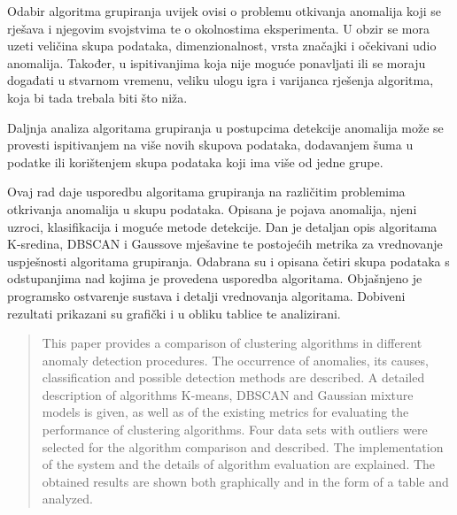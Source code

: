 \documentclass[utf8, diplomski, numeric]{fer}
\begin{document}
Odabir algoritma grupiranja uvijek ovisi o problemu otkivanja anomalija koji se rješava i njegovim svojstvima te o okolnostima eksperimenta. U obzir se mora uzeti veličina skupa podataka, dimenzionalnost, vrsta značajki i očekivani udio anomalija. Također, u ispitivanjima koja nije moguće ponavljati ili se moraju događati u stvarnom vremenu, veliku ulogu igra i varijanca rješenja algoritma, koja bi tada trebala biti što niža. 

Daljnja analiza algoritama grupiranja u postupcima detekcije anomalija može se provesti ispitivanjem na više novih skupova podataka, dodavanjem šuma u podatke ili korištenjem skupa podataka koji ima više od jedne grupe.

\nocite{*}



\begin{sazetak}
Ovaj rad daje usporedbu algoritama grupiranja na različitim problemima otkrivanja anomalija u skupu podataka. Opisana je pojava anomalija, njeni uzroci, klasifikacija i moguće metode detekcije. Dan je detaljan opis algoritama K-sredina, DBSCAN i Gaussove mješavine te postojećih metrika za vrednovanje uspješnosti algoritama grupiranja. Odabrana su i opisana četiri skupa podataka s odstupanjima nad kojima je provedena usporedba algoritama. Objašnjeno je programsko ostvarenje sustava i detalji vrednovanja algoritama. Dobiveni rezultati prikazani su grafički i u obliku tablice te analizirani.

\end{sazetak}

\begin{abstract}
This paper provides a comparison of clustering algorithms in different anomaly detection procedures. The occurrence of anomalies, its causes, classification and possible detection methods are described. A detailed description of algorithms K-means, DBSCAN and Gaussian mixture models is given, as well as of the existing metrics for evaluating the performance of clustering algorithms. Four data sets with outliers were selected for the algorithm comparison and described. The implementation of the system and the details of algorithm evaluation are explained. The obtained results are shown both graphically and in the form of a table and analyzed.

\end{abstract}
\end{document}
